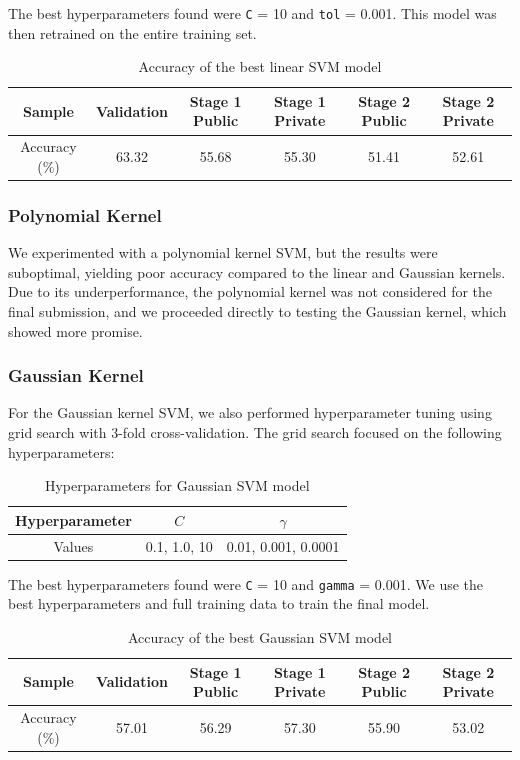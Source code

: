 \documentclass[11pt,a4paper]{article}
\begin{document}
The best hyperparameters found were \texttt{C} = 10 and \texttt{tol} = 0.001. This model was then retrained on the entire training set.

\begin{table}[H]
  \centering
  \begin{tabular}{|c|c|c|c|c|c|}
  \hline
  Sample & Validation & Stage 1 Public & Stage 1 Private & Stage 2 Public & Stage 2 Private \\ \hline
  Accuracy (\%) & 63.32 & 55.68 & 55.30 & 51.41 & 52.61 \\ \hline
  \end{tabular}
  \caption{Accuracy of the best linear SVM model}
\end{table}


\subsubsection{Polynomial Kernel}
We experimented with a polynomial kernel SVM, but the results were suboptimal, yielding poor accuracy compared to the linear and Gaussian kernels. Due to its underperformance, the polynomial kernel was not considered for the final submission, and we proceeded directly to testing the Gaussian kernel, which showed more promise.


\subsubsection{Gaussian Kernel}
For the Gaussian kernel SVM, we also performed hyperparameter tuning using grid search with 3-fold cross-validation. The grid search focused on the following hyperparameters:

\begin{table}[H]
  \centering
  \begin{tabular}{|c|c|c|}
  \hline
  Hyperparameter & $C$ & $\gamma$ \\ \hline
  Values & 0.1, 1.0, 10 & 0.01, 0.001, 0.0001 \\ \hline
  \end{tabular}
  \caption{Hyperparameters for Gaussian SVM model}
\end{table}

The best hyperparameters found were \texttt{C} = 10 and \texttt{gamma} = 0.001. We use the best hyperparameters and full training data to train the final model.

\begin{table}[H]
  \centering
  \begin{tabular}{|c|c|c|c|c|c|}
  \hline
  Sample & Validation & Stage 1 Public & Stage 1 Private & Stage 2 Public & Stage 2 Private \\ \hline
  Accuracy (\%) & 57.01 & 56.29 & 57.30 & 55.90 & 53.02 \\ \hline
  \end{tabular}
  \caption{Accuracy of the best Gaussian SVM model}
\end{table}
\end{document}
